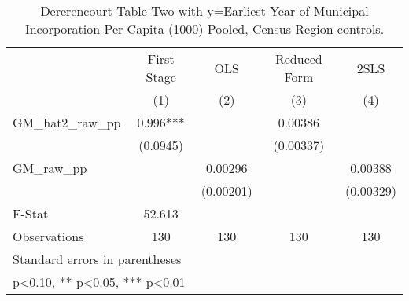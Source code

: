 \begin{table}[htbp]\centering
\def\sym#1{\ifmmode^{#1}\else\(^{#1}\)\fi}
\caption{Dererencourt Table Two with y=Earliest Year of Municipal Incorporation Per Capita (1000) Pooled, Census Region controls.}
\begin{tabular}{l*{4}{c}}
\toprule
                    & First Stage   &         OLS   &Reduced Form   &        2SLS   \\
                    &\multicolumn{1}{c}{(1)}   &\multicolumn{1}{c}{(2)}   &\multicolumn{1}{c}{(3)}   &\multicolumn{1}{c}{(4)}   \\
\midrule
GM\_hat2\_raw\_pp      &       0.996***&               &     0.00386   &               \\
                    &    (0.0945)   &               &   (0.00337)   &               \\
\addlinespace
GM\_raw\_pp           &               &     0.00296   &               &     0.00388   \\
                    &               &   (0.00201)   &               &   (0.00329)   \\
\midrule
F-Stat              &      52.613   &               &               &               \\
Observations        &         130   &         130   &         130   &         130   \\
\bottomrule
\multicolumn{5}{l}{\footnotesize Standard errors in parentheses}\\
\multicolumn{5}{l}{\footnotesize * p<0.10, ** p<0.05, *** p<0.01}\\
\end{tabular}
\end{table}

